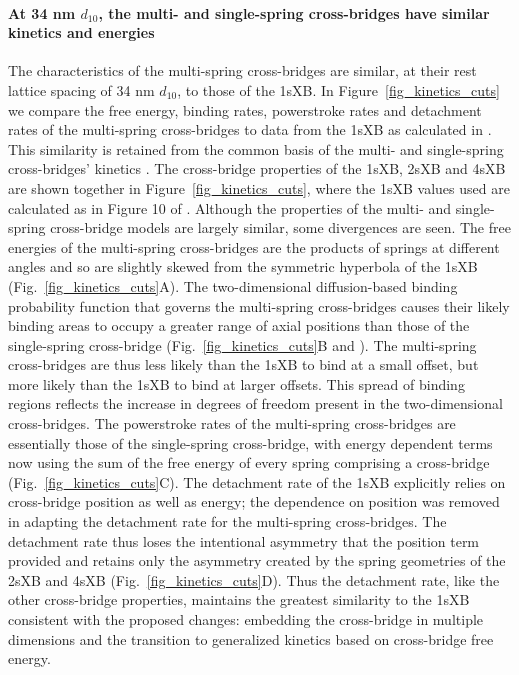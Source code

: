 \documentclass[]{article}
\begin{document}
\paragraph{At 34 nm $d_{10}$, the multi- and single-spring cross-bridges have similar kinetics and energies} %
The characteristics of the multi-spring cross-bridges are similar, at their rest lattice spacing of 34 nm $d_{10}$, to those of the 1sXB\@.
In Figure~\ref{fig_kinetics_cuts} we compare the free energy, binding rates, powerstroke rates and detachment rates of the multi-spring cross-bridges to data from the 1sXB as calculated in \citet{Tanner2007}. 
This similarity is retained from the common basis of the multi- and single-spring cross-bridges' kinetics \citep{Pate1989}.
The cross-bridge properties of the 1sXB, 2sXB and 4sXB are shown together in Figure~\ref{fig_kinetics_cuts}, where the 1sXB values used are calculated as in Figure 10 of \citet{Tanner2007}. 
Although the properties of the multi- and single-spring cross-bridge models are largely similar, some divergences are seen. 
The free energies of the multi-spring cross-bridges are the products of springs at different angles and so are slightly skewed from the symmetric hyperbola of the 1sXB  (Fig.~\ref{fig_kinetics_cuts}A).
The two-dimensional diffusion-based binding probability function that governs the multi-spring cross-bridges causes their likely binding areas to occupy a greater range of axial positions than those of the single-spring cross-bridge (Fig.~\ref{fig_kinetics_cuts}B and \citet{BergBook, DillBook}).
The multi-spring cross-bridges are thus less likely than the 1sXB to bind at a small offset, but more likely than the 1sXB to bind at larger offsets. 
This spread of binding regions reflects the increase in degrees of freedom present in the two-dimensional cross-bridges. 
The powerstroke rates of the multi-spring cross-bridges are essentially those of the single-spring cross-bridge, with energy dependent terms now using the  sum of the free energy of every spring comprising a cross-bridge  (Fig.~\ref{fig_kinetics_cuts}C). 
The detachment rate of the 1sXB explicitly relies on cross-bridge position as well as energy; the dependence on position was removed in adapting the detachment rate for the multi-spring cross-bridges. 
The detachment rate thus loses the intentional asymmetry that the position term provided and retains only the asymmetry created by the spring geometries of the 2sXB and 4sXB (Fig.~\ref{fig_kinetics_cuts}D). 
Thus the detachment rate, like the other cross-bridge properties, maintains the greatest similarity to the 1sXB consistent with the proposed changes: embedding the cross-bridge in multiple dimensions and the transition to generalized kinetics based on cross-bridge free energy. 
\end{document}
